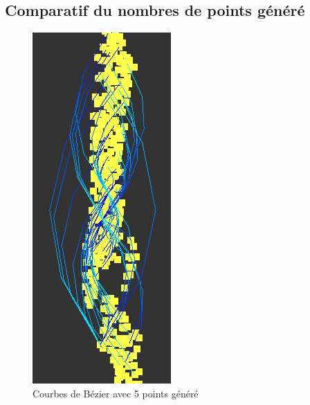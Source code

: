 \documentclass[12pt]{article}
\begin{document}
		\subsection{Comparatif du nombres de points généré}	 \label{comparatif_courbes_bezier}		
		\begin{figure}[!h]
		\begin{center}
		\includegraphics[scale=.60]{5_generated_points.png}
		\caption{Courbes de Bézier avec 5 points généré}
		\end{center}
		\end{figure}
		
\end{document}
